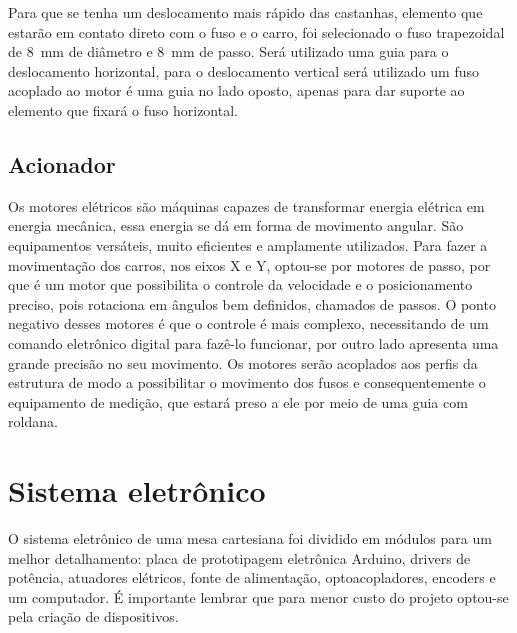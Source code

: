 Para que se tenha um deslocamento mais rápido das castanhas, elemento que estarão em contato 
direto com o fuso e o carro, foi selecionado o fuso trapezoidal de 8~mm de diâmetro e 8~mm de passo. 
Será utilizado uma guia para o deslocamento horizontal, para o deslocamento vertical será utilizado 
um fuso acoplado ao motor é uma guia no lado oposto, apenas para dar suporte ao elemento que fixará 
o fuso horizontal.

\subsection{Acionador}\label{subsec:metacionador}

Os motores elétricos são máquinas capazes de transformar energia elétrica em energia mecânica, 
essa energia se dá em forma de movimento angular. São equipamentos versáteis, muito eficientes 
e amplamente utilizados. Para fazer a movimentação dos carros, nos eixos X e Y, optou-se por 
motores de passo, por que é um motor que possibilita o controle da velocidade e o posicionamento 
preciso, pois rotaciona em ângulos bem definidos, chamados de passos. O ponto negativo desses 
motores é que o controle é mais complexo, necessitando de um comando eletrônico digital para 
fazê-lo funcionar, por outro lado apresenta uma grande precisão no seu movimento. Os motores 
serão acoplados aos perfis da estrutura de modo a possibilitar o movimento dos fusos e consequentemente 
o equipamento de medição, que estará preso a ele por meio de uma guia com roldana. 

\section{Sistema eletrônico}\label{sec:metsisele}

O sistema eletrônico de uma mesa cartesiana foi dividido em módulos para um melhor detalhamento: 
placa de prototipagem eletrônica Arduino, drivers de potência, atuadores elétricos, fonte de alimentação, 
optoacopladores, encoders e um computador. É importante lembrar que para menor custo do projeto optou-se 
pela criação de dispositivos.


